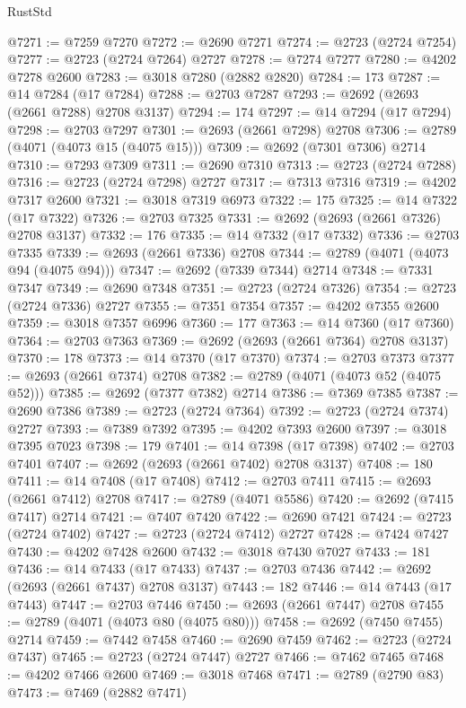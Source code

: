 \begin{lexlean}{RustStd}
\begin{coremodule}
@7271 := @7259 @7270
@7272 := @2690 @7271
@7274 := @2723 (@2724 @7254)
@7277 := @2723 (@2724 @7264) @2727
@7278 := @7274 @7277
@7280 := @4202 @7278 @2600
@7283 := @3018 @7280 (@2882 @2820)
@7284 := 173
@7287 := @14 @7284 (@17 @7284)
@7288 := @2703 @7287
@7293 := @2692 (@2693 (@2661 @7288) @2708 @3137)
@7294 := 174
@7297 := @14 @7294 (@17 @7294)
@7298 := @2703 @7297
@7301 := @2693 (@2661 @7298) @2708
@7306 := @2789 (@4071 (@4073 @15 (@4075 @15)))
@7309 := @2692 (@7301 @7306) @2714
@7310 := @7293 @7309
@7311 := @2690 @7310
@7313 := @2723 (@2724 @7288)
@7316 := @2723 (@2724 @7298) @2727
@7317 := @7313 @7316
@7319 := @4202 @7317 @2600
@7321 := @3018 @7319 @6973
@7322 := 175
@7325 := @14 @7322 (@17 @7322)
@7326 := @2703 @7325
@7331 := @2692 (@2693 (@2661 @7326) @2708 @3137)
@7332 := 176
@7335 := @14 @7332 (@17 @7332)
@7336 := @2703 @7335
@7339 := @2693 (@2661 @7336) @2708
@7344 := @2789 (@4071 (@4073 @94 (@4075 @94)))
@7347 := @2692 (@7339 @7344) @2714
@7348 := @7331 @7347
@7349 := @2690 @7348
@7351 := @2723 (@2724 @7326)
@7354 := @2723 (@2724 @7336) @2727
@7355 := @7351 @7354
@7357 := @4202 @7355 @2600
@7359 := @3018 @7357 @6996
@7360 := 177
@7363 := @14 @7360 (@17 @7360)
@7364 := @2703 @7363
@7369 := @2692 (@2693 (@2661 @7364) @2708 @3137)
@7370 := 178
@7373 := @14 @7370 (@17 @7370)
@7374 := @2703 @7373
@7377 := @2693 (@2661 @7374) @2708
@7382 := @2789 (@4071 (@4073 @52 (@4075 @52)))
@7385 := @2692 (@7377 @7382) @2714
@7386 := @7369 @7385
@7387 := @2690 @7386
@7389 := @2723 (@2724 @7364)
@7392 := @2723 (@2724 @7374) @2727
@7393 := @7389 @7392
@7395 := @4202 @7393 @2600
@7397 := @3018 @7395 @7023
@7398 := 179
@7401 := @14 @7398 (@17 @7398)
@7402 := @2703 @7401
@7407 := @2692 (@2693 (@2661 @7402) @2708 @3137)
@7408 := 180
@7411 := @14 @7408 (@17 @7408)
@7412 := @2703 @7411
@7415 := @2693 (@2661 @7412) @2708
@7417 := @2789 (@4071 @5586)
@7420 := @2692 (@7415 @7417) @2714
@7421 := @7407 @7420
@7422 := @2690 @7421
@7424 := @2723 (@2724 @7402)
@7427 := @2723 (@2724 @7412) @2727
@7428 := @7424 @7427
@7430 := @4202 @7428 @2600
@7432 := @3018 @7430 @7027
@7433 := 181
@7436 := @14 @7433 (@17 @7433)
@7437 := @2703 @7436
@7442 := @2692 (@2693 (@2661 @7437) @2708 @3137)
@7443 := 182
@7446 := @14 @7443 (@17 @7443)
@7447 := @2703 @7446
@7450 := @2693 (@2661 @7447) @2708
@7455 := @2789 (@4071 (@4073 @80 (@4075 @80)))
@7458 := @2692 (@7450 @7455) @2714
@7459 := @7442 @7458
@7460 := @2690 @7459
@7462 := @2723 (@2724 @7437)
@7465 := @2723 (@2724 @7447) @2727
@7466 := @7462 @7465
@7468 := @4202 @7466 @2600
@7469 := @3018 @7468
@7471 := @2789 (@2790 @83)
@7473 := @7469 (@2882 @7471)

\end{coremodule}
\end{lexlean}

